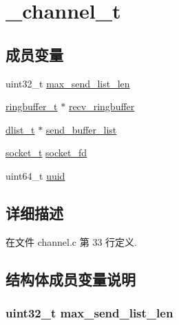 \hypertarget{struct__channel__t}{}\section{\+\_\+channel\+\_\+t}
\label{struct__channel__t}
\subsection*{成员变量}
\begin{DoxyCompactItemize}
\item 
uint32\+\_\+t \hyperlink{struct__channel__t_a967606ac2f07de7268da6970a56b7ab1}{max\+\_\+send\+\_\+list\+\_\+len}
\item 
\hyperlink{config_8h_af929c5cf86b6a0f64dde407dfe60482e}{ringbuffer\+\_\+t} $\ast$ \hyperlink{struct__channel__t_ab42a82a086d2d4d5946e5af77d95bd52}{recv\+\_\+ringbuffer}
\item 
\hyperlink{config_8h_ad6644d67df4b4e3596c1eb12977d1d16}{dlist\+\_\+t} $\ast$ \hyperlink{struct__channel__t_a92dac2c6eec6322971fd3b842107a7a8}{send\+\_\+buffer\+\_\+list}
\item 
\hyperlink{config_8h_a0d9e0afbf02fb6ed6c5b1415dce51b05}{socket\+\_\+t} \hyperlink{struct__channel__t_ae1421d1046e5f40613ebe58da2b170e9}{socket\+\_\+fd}
\item 
uint64\+\_\+t \hyperlink{struct__channel__t_a39dd6627d886e64fade4f193f5839759}{uuid}
\end{DoxyCompactItemize}


\subsection{详细描述}


在文件 channel.\+c 第 33 行定义.



\subsection{结构体成员变量说明}
\hypertarget{struct__channel__t_a967606ac2f07de7268da6970a56b7ab1}{}
\subsubsection[{max\+\_\+send\+\_\+list\+\_\+len}]{\setlength{\rightskip}{0pt plus 5cm}uint32\+\_\+t max\+\_\+send\+\_\+list\+\_\+len}\label{struct__channel__t_a967606ac2f07de7268da6970a56b7ab1}


